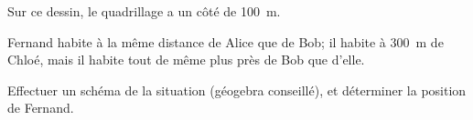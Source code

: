 
\begin{exercice}\label{exo2smath-0212}


    \begin{multicols}{2}

\begin{center}
   
\end{center}

\columnbreak

Sur ce dessin, le quadrillage a un côté de \SI{100}{\metre}. 

Fernand habite à la même distance de Alice que de Bob; il habite à \SI{300}{\metre} de Chloé, mais il habite tout de même plus près de Bob que d'elle.

Effectuer un schéma de la situation (géogebra conseillé), et déterminer la position de Fernand.
    \end{multicols}

\end{exercice}
